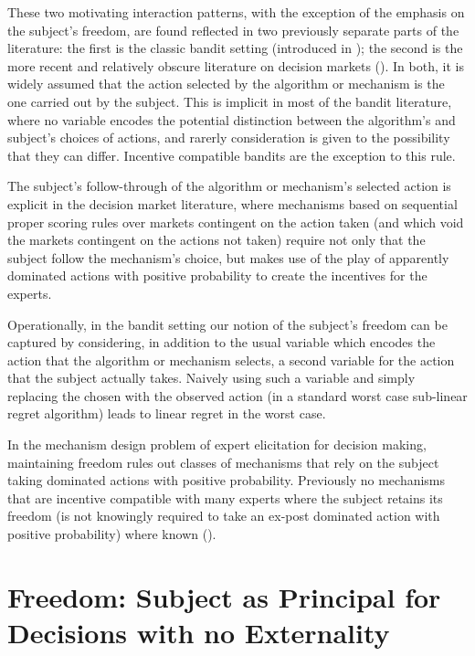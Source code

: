These two motivating interaction patterns, with the exception of the emphasis on the subject's freedom, are found reflected in two previously separate parts of the literature: the first is the classic bandit setting (introduced in \cite{thompson:33}); the second is the more recent and relatively obscure literature on decision markets (\cite{berg2003prediction,hanson2002decision,othman2010decision,boutilier2012eliciting,chen2014eliciting}). In both, it is widely assumed that the action selected by the algorithm or mechanism is the one carried out by the subject. This is implicit in most of the bandit literature, where no variable encodes the potential distinction between the algorithm's and subject's choices of actions, and rarerly consideration is given to the possibility that they can differ. Incentive compatible bandits \cite{kremer2014implementing,mansour2015bayesian,mansour2016bayesian} are the exception to this rule.

The subject's follow-through of the algorithm or mechanism's selected action is explicit in the decision market literature, where mechanisms based on sequential proper scoring rules over markets contingent on the action taken (and which void the markets contingent on the actions not taken) require not only that the subject follow the mechanism's choice, but makes use of the play of apparently dominated actions with positive probability to create the incentives for the experts.

Operationally, in the bandit setting our notion of the subject's freedom can be captured by considering, in addition to the usual variable which encodes the action that the algorithm  or mechanism selects, a second variable for the action that the subject actually takes. Naively using such a variable and simply replacing the chosen with the observed action (in a standard worst case sub-linear regret algorithm) leads to linear regret in the worst case.

In the mechanism design problem of expert elicitation for decision making, maintaining freedom rules out classes of mechanisms that rely on the subject taking dominated actions with positive probability. Previously no mechanisms that are incentive compatible with many experts where the subject retains its freedom (is not knowingly required to take an ex-post dominated action with positive probability) where known (\cite{othman2010decision,chen2014eliciting}).



\section{Freedom: Subject as Principal for Decisions with no Externality}

